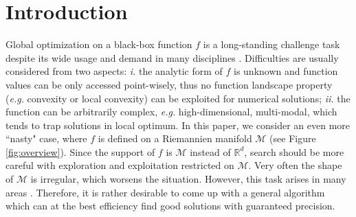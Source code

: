 \documentclass{article} %
\begin{document}
\section{Introduction}
Global optimization on a black-box function $f$ is a long-standing challenge task  
despite its wide usage and demand in many disciplines \cite{black_box_optimization, black_box_optimization_book}.    
Difficulties are usually considered from two aspects: \emph{i.} the analytic form of $f$ is unknown and function values can 
be only accessed point-wisely, thus no function landscape property (\emph{e.g.} convexity or local convexity) can be exploited for numerical solutions;     
\emph{ii.} the function can be arbitrarily complex, \emph{e.g.} high-dimensional, multi-modal, which tends to trap solutions in local optimum. 
In this paper, we consider an even more ``nasty" case, where 
$f$ is defined on a Riemannien manifold $\mathcal{M}$ (see Figure \ref{fig:overview}). Since the support of $f$ is $\mathcal{M}$ instead of $\mathbb{R}^d$, search     
should be more careful with exploration and exploitation restricted on $\mathcal{M}$.       
Very often the shape of $\mathcal{M}$ is irregular, which worsens the situation.       
However, this task arises in many areas \cite{SA_registration, Geo_MCMC}. 
Therefore, it is rather desirable to come up with a general algorithm which can at the best efficiency find good solutions with guaranteed 
precision. 
\end{document}
